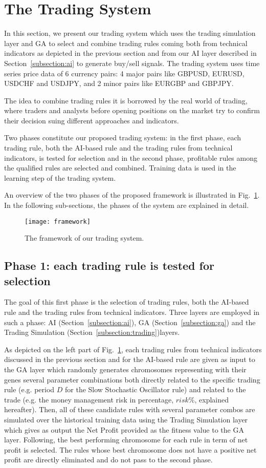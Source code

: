 \section{The Trading System}
In this section, we present our trading system which uses the trading simulation layer and GA to select and combine trading rules coming both from technical indicators as depicted in the previous section and from our AI layer described in Section~\ref{subsection:ai} to generate buy/sell signals. The trading system uses time series price data of 6 currency pairs: 4 major pairs like GBPUSD, EURUSD, USDCHF and USDJPY, and 2 minor pairs like EURGBP and GBPJPY.

The idea to combine trading rules it is borrowed by the real world of trading, where traders and analysts before opening positions on the market try to confirm their decision suing different approaches and indicators. 

Two phases constitute our proposed trading system: in the first phase, each trading rule, both the AI-based rule and the trading rules from technical indicators, is tested for selection and in the second phase, profitable rules among the qualified rules are selected and combined. Training data is used in the learning step of the trading system.

An overview of the two phases of the proposed framework is illustrated in Fig.~\ref{fig:sys}. In the following sub-sections, the phases of the system are explained in detail.

\begin{figure}[h]
\texttt{[image: framework]}
\centering
\caption{The framework of our trading system.}
\label{fig:sys} 
\end{figure}

\subsection{Phase 1: each trading rule is tested for selection}
The goal of this first phase is the selection of trading rules, both the AI-based rule and the trading rules from technical indicators. Three layers are employed in such a phase: AI (Section~\ref{subsection:ai}), GA (Section~\ref{subsection:ga}) and the Trading Simulation (Section~\ref{subsection:trading})layers. 

As depicted on the left part of Fig.~\ref{fig:sys}, each trading rules from technical indicators discussed in the previous section and for the AI-based rule are given as input to the GA layer which randomly generates chromosomes representing with their genes several parameter combinations both directly related to the specific trading rule (e.g. period $D$ for the Slow Stochastic Oscillator rule) and related to the trade (e.g. the money management risk in percentage, $risk\%$, explained hereafter). Then, all of these candidate rules with several parameter combos are simulated over the historical training data using the Trading Simulation layer which gives as output the Net Profit provided as the fitness value to the GA layer. Following, the best performing chromosome for each rule in term of net profit is selected. 
The rules whose best chromosome does not have a positive net profit are directly eliminated and do not pass to the second phase.


